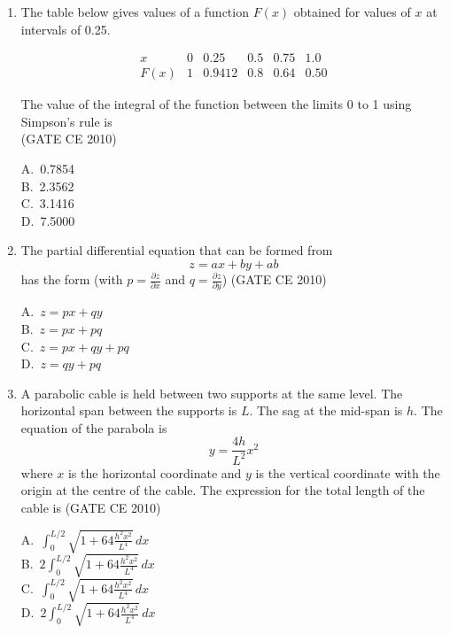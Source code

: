 \documentclass[journal,12pt,onecolumn]{exam}
\theoremstyle{remark}
\begin{document}
\begin{enumerate}
\noindent\item The table below gives values of a function $F(x)$ obtained for values of $x$ at intervals of 0.25.

\[
\begin{array}{c|c|c|c|c|c}
x & 0 & 0.25 & 0.5 & 0.75 & 1.0 \\
\hline
F(x) & 1 & 0.9412 & 0.8 & 0.64 & 0.50
\end{array}
\]

The value of the integral of the function between the limits 0 to 1 using Simpson's rule is
\\ \hfill{(GATE CE 2010)}
\begin{multicols}{4}
A.\ 0.7854 \\
B.\ 2.3562 \\
C.\ 3.1416 \\
D.\ 7.5000
\end{multicols}



\noindent\item The partial differential equation that can be formed from 
\[
z = ax + by + ab
\]
has the form (with $p = \frac{\partial z}{\partial x}$ and $q = \frac{\partial z}{\partial y}$)
\hfill{(GATE CE 2010)}
\begin{multicols}{4}
A.\ $z = px + qy$ \\
B.\ $z = px + pq$ \\
C.\ $z = px + qy + pq$ \\
D.\ $z = qy + pq$
\end{multicols}

\noindent\item A parabolic cable is held between two supports at the same level. The horizontal span between the supports is $L$. The sag at the mid-span is $h$. The equation of the parabola is 
\[
y = \frac{4h}{L^2} x^2
\]
where $x$ is the horizontal coordinate and $y$ is the vertical coordinate with the origin at the centre of the cable. The expression for the total length of the cable is
\hfill{(GATE CE 2010)}

A.\ $\int_0^{L/2} \sqrt{1 + 64 \frac{h^2 x^2}{L^4}} \, dx$ \\
B.\ $2 \int_0^{L/2} \sqrt{1 + 64 \frac{h^2 x^2}{L^4}} \, dx$ \\
C.\ $\int_0^{L/2} \sqrt{1 + 64 \frac{h^2 x^2}{L^4}} \, dx$ \\
D.\ $2 \int_0^{L/2} \sqrt{1 + 64 \frac{h^2 x^2}{L^4}} \, dx$


\end{enumerate}
\end{document}
